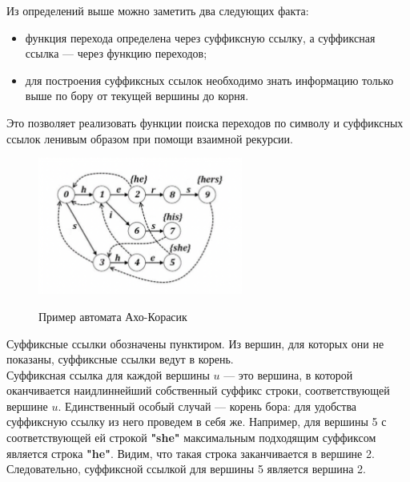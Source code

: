 \begin{enumerate}[label=\textbf{\arabic* Шаг}:]
            Из определений выше можно заметить два следующих факта:
            
            \begin{itemize}
              \item функция перехода определена через суффиксную ссылку, а суффиксная ссылка --- через функцию переходов;
              \item для построения суффиксных ссылок необходимо знать информацию только выше по бору от текущей вершины до корня.
            \end{itemize}
            
            Это позволяет реализовать функции поиска переходов по символу и суффиксных ссылок ленивым образом при помощи взаимной рекурсии.

            \begin{figure}[H]
                    \centering
                    \includegraphics[width=0.6\textwidth]{images/chapter9/acho-korasik-automat-example.png}
                    \label{fig:images/chapter9/acho-korasik-automat-example.png}
                    \caption{Пример автомата Ахо-Корасик}
            \end{figure}

            
            Суффиксные ссылки обозначены пунктиром. Из вершин, для которых они не показаны, суффиксные ссылки ведут в корень.\\
            
            Суффиксная ссылка для каждой вершины $u$ --- это вершина, в которой оканчивается наидлиннейший собственный суффикс строки, соответствующей вершине $u$. Единственный особый случай --- корень бора: для удобства суффиксную ссылку из него проведем в себя же. Например, для вершины 5 с соответствующей ей строкой \textbf{"she"} максимальным подходящим суффиксом является строка \textbf{"he"}. Видим, что такая строка заканчивается в вершине 2. Следовательно, суффиксной ссылкой для вершины 5 является вершина 2.


\end{enumerate}
